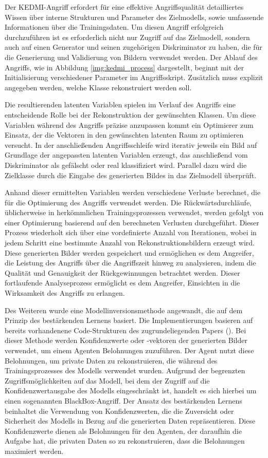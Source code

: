 Der \glqq KEDMI\grqq-Angriff erfordert für eine effektive Angriffsqualität detailliertes Wissen über interne Strukturen und Parameter des Zielmodells, sowie umfassende Informationen über die Trainingsdaten. Um diesen Angriff erfolgreich durchzuführen ist es erforderlich nicht nur Zugriff auf das Zielmodell, sondern auch auf einen Generator und seinen zugehörigen Diskriminator zu haben, die für die Generierung und Validierung von Bildern verwendet werden. Der Ablauf des Angriffs, wie in Abbildung \ref{img:kedmi_process} dargestellt, beginnt mit der Initialisierung verschiedener Parameter im Angriffsskript. Zusätzlich muss explizit angegeben werden, welche Klasse rekonstruiert werden soll.

Die resultierenden latenten Variablen spielen im Verlauf des Angriffs eine entscheidende Rolle bei der Rekonstruktion der gewünschten Klassen. Um diese Variablen während des Angriffs präzise anzupassen kommt ein Optimierer zum Einsatz, der die Vektoren in den gewünschten latenten Raum zu optimieren versucht. In der anschließenden Angriffsschleife wird iterativ jeweils ein Bild auf Grundlage der angepassten latenten Variablen erzeugt, das anschließend vom Diskriminator als gefälscht oder real klassifiziert wird. Parallel dazu wird die Zielklasse durch die Eingabe des generierten Bildes in das Zielmodell überprüft.

Anhand dieser ermittelten Variablen werden verschiedene Verluste berechnet, die für die Optimierung des Angriffs verwendet werden. Die Rückwärtsdurchläufe, üblicherweise in herkömmlichen Trainingsprozessen verwendet, werden gefolgt von einer Optimierung basierend auf den berechneten Verlusten durchgeführt. Dieser Prozess wiederholt sich über eine vordefinierte Anzahl von Iterationen, wobei in jedem Schritt eine bestimmte Anzahl von Rekonstruktionsbildern erzeugt wird. Diese generierten Bilder werden gespeichert und ermöglichen es dem Angreifer, die Leistung des Angriffs über die Angriffszeit hinweg zu analysieren, indem die Qualität und Genauigkeit der Rückgewinnungen betrachtet werden. Dieser fortlaufende Analyseprozess ermöglicht es dem Angreifer, Einsichten in die Wirksamkeit des Angriffs zu erlangen.

Des Weiteren wurde eine Modellinversionsmethode angewandt, die auf dem Prinzip des bestärkenden Lernens basiert. Die Implementierungen basieren auf bereits vorhandenene Code-Strukturen des zugrundeliegenden Papers (\cite{han_reinforcement_2023}). Bei dieser Methode werden Konfidenzwerte oder -vektoren der generierten Bilder verwendet, um einem Agenten Belohnungen zuzuführen. Der Agent nutzt diese Belohnungen, um private Daten zu rekonstruieren, die während des Trainingsprozesses des Modells verwendet wurden. Aufgrund der begrenzten Zugriffsmöglichkeiten auf das Modell, bei dem der Zugriff auf die Konfidenzwertausgabe des Modells eingeschränkt ist, handelt es sich hierbei um einen sogenannten BlackBox-Angriff.
Der Ansatz des bestärkenden Lernens beinhaltet die Verwendung von Konfidenzwerten, die die Zuversicht oder Sicherheit des Modells in Bezug auf die generierten Daten repräsentieren. Diese Konfidenzwerte dienen als Belohnungen für den Agenten, der daraufhin die Aufgabe hat, die privaten Daten so zu rekonstruieren, dass die Belohnungen maximiert werden.

